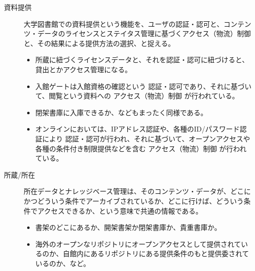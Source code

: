 \documentclass[submit,noauthor]{ono}
\begin{document}
\begin{description}
  \item[資料提供] 大学図書館での資料提供という機能を、ユーザの認証・認可と、コンテンツ・データのライセンスとステイタス管理に基づくアクセス（物流）制御と、その結果による提供方法の選択、と捉える。
\begin{itemize}
	\item 所蔵に紐づくライセンスデータと、それを認証・認可に紐づけると、貸出とかアクセス管理になる。
	\item 入館ゲートは入館資格の確認という 認証・認可であり、それに基づいて、閲覧という資料への アクセス（物流）制御 が行われている。
	\item 閉架書庫に入庫できるか、などもまったく同様である。
	\item オンラインにおいては、IPアドレス認証や、各種のID/パスワード認証により 認証・認可が行われ、それに基づいて、オープンアクセスや各種の条件付き制限提供などを含む アクセス（物流）制御 が行われている。
\end{itemize}
\end{description}

\begin{description}
  \item[所蔵/所在] 所在データとナレッジベース管理は、そのコンテンツ・データが、どこにかつどういう条件でアーカイブされているか、どこに行けば、どういう条件でアクセスできるか、という意味で共通の情報である。
  \begin{itemize}
		\item 書架のどこにあるか、開架書架か閉架書庫か、貴重書庫か。
		\item 海外のオープンなリポジトリにオープンアクセスとして提供されているのか、自館内にあるリポジトリにある提供条件のもと提供委されているのか、など。
\end{itemize}
\end{description}
\end{document}
